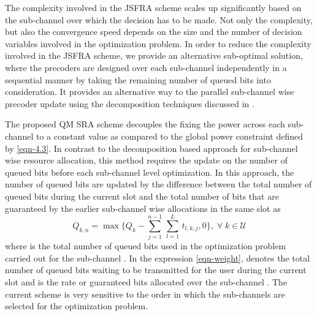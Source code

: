 
The complexity involved in the \ac{JSFRA} scheme scales up significantly based on the sub-channel over which the decision has to be made. Not only the complexity, but also the convergence speed depends on the size  and the number of decision variables involved in the optimization problem. In order to reduce the complexity involved in the \ac{JSFRA} scheme, we provide an alternative sub-optimal solution, where the precoders are designed over each sub-channel independently in a sequential manner by taking the remaining number of queued bits into consideration. It provides an alternative way to the parallel sub-channel wise precoder update using the decomposition techniques discussed in \cite{palomar2006tutorial,boyd2011distributed}.

The proposed \acf{QM} \ac{SRA} scheme decouples the fixing the power across each sub-channel to a constant value as compared to the global power constraint defined by \eqref{eqn-4.3}. In contrast to the decomposition based approach for sub-channel wise resource allocation, this method requires the update on the number of queued bits before each sub-channel level optimization. In this approach, the number of queued bits are updated by the difference between the total number of queued bits during the current slot and the total number of bits that are guaranteed by the earlier sub-channel wise allocations in the same slot as
\begin{equation}
Q_{k,n} = \max{\Big \lbrace Q_k - \sum_{j = 1}^{n-1} \, \sum_{l = 1}^{L} \, t_{l,k,j} ,0 \Big \rbrace }, \; \forall \; k \in \mathcal{U}
\label{eqn-weight}
\end{equation}
where  is the total number of queued bits used in the optimization problem carried out for the sub-channel . In the expression \eqref{eqn-weight},  denotes the total number of queued bits waiting to be transmitted for the user  during the current slot and  is the rate or guaranteed bits allocated over the sub-channel . The current scheme is very sensitive to the order in which the sub-channels are selected for the optimization problem.
